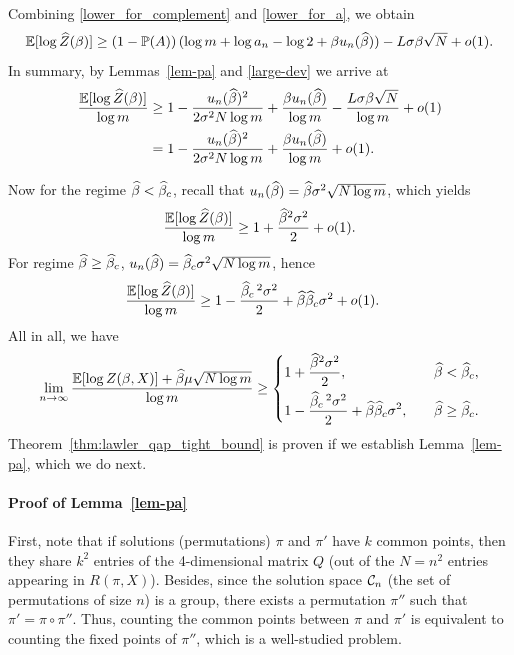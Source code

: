 Combining \eqref{lower_for_complement} and \eqref{lower_for_a}, we obtain
\begin{equation}\label{combined_lower}
  {\mathbb{E}}[\log \widehat{Z}(\beta)] 
    \geq \left( 1 - {\mathbb{P}}(A) \right) 
      (\log m + \log a_n - \log 2 + \beta u_n(\widehat{\beta})) - L\sigma\beta\sqrt{N} + o(1).
\end{equation}
In summary, by Lemmas~\ref{lem-pa} and \ref{large-dev} 
we arrive at
\begin{align}
\frac{{\mathbb{E}}[\log \widehat{Z}(\beta)]}{\log m}
&\geq 1 - \frac{u_n(\widehat{\beta})^2}{2\sigma^2N\log m} + \frac{\beta u_n(\widehat{\beta})}{\log m} - \frac{L\sigma\beta\sqrt{N}}{\log m} + o(1)\\
&= 1 - \frac{u_n(\widehat{\beta})^2}{2\sigma^2N\log m} + \frac{\beta u_n(\widehat{\beta})}{\log m} + o(1).
\end{align}

Now for the regime $\widehat{\beta}<\widehat{\beta}_c$, recall that $u_n(\widehat{\beta})=\widehat{\beta}\sigma^2\sqrt{N\log m}$, which yields
\begin{equation}
\frac{{\mathbb{E}}[\log \widehat{Z}(\beta)]}{\log m}
\geq 1 + \frac{\widehat{\beta}^2\sigma^2}{2} + o(1).
\end{equation}
For regime $\widehat{\beta}\geq\widehat{\beta}_c$, $u_n(\widehat{\beta})=\widehat{\beta}_c\sigma^2\sqrt{N\log m}$, hence
\begin{align}
\frac{{\mathbb{E}}[\log \widehat{Z}(\beta)]}{\log m}
&\geq 1 - \frac{\widehat{\beta}_c\,^2\sigma^2}{2} + \widehat{\beta}\widehat{\beta}_c\sigma^2  + o(1).
\end{align}
All in all, we have 
\begin{equation}
  \lim_{n\to \infty} \frac{{\mathbb{E}}[\log Z(\beta, X)] +\widehat \beta \mu \sqrt{N\log m}}{\log m}
  \geq
  \left\{
    \begin{aligned}
      &1+\frac{\widehat{\beta}^2\sigma^2}{2}, & &\quad\widehat{\beta}< \widehat{\beta}_c,\\
      &1 - \frac{\widehat{\beta}_c\,^2\sigma^2}{2} + \widehat{\beta}\widehat{\beta}_c\sigma^2, & &\quad\widehat{\beta}\ge \widehat{\beta}_c.
    \end{aligned}
  \right.
\end{equation}
Theorem~\ref{thm:lawler_qap_tight_bound} is proven if we establish
Lemma~\ref{lem-pa}, which we do next. \QEDA

\paragraph{Proof of Lemma~\ref{lem-pa}} 
First, note that if solutions (permutations) $\pi$ and $\pi'$ have $k$ common
points, then they share $k^2$ entries of the 4-dimensional matrix $Q$ (out of
the $N=n^2$ entries appearing in $R(\pi,X)$). Besides, since the solution space
${\cal C}_n$ (the set of permutations of size $n$) is a group, there exists a
permutation $\pi''$ such that $\pi'=\pi\circ\pi''$. Thus, counting the common
points between $\pi$ and $\pi'$ is equivalent to counting the fixed points of
$\pi''$, which is a well-studied problem.

